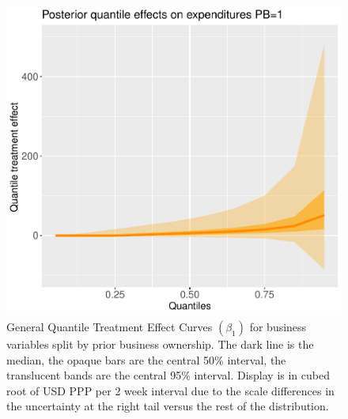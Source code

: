 \documentclass[AER]{AEA}
\begin{document}
\begin{figure}[h!]
    \includegraphics{posterior_parent_quantile_TEs_expenditures_pb_1_lognormal.pdf}
  \caption{ General Quantile Treatment Effect Curves $(\beta_1)$ for business variables split by prior business ownership. The dark line is the median, the opaque bars are the central 50\% interval, the translucent bands are the central 95\% interval. Display is in cubed root of USD PPP per 2 week interval due to the scale differences in the uncertainty at the right tail versus the rest of the distribution. }\label{posterior mean quantiles profit pb split}
\end{figure}









\clearpage \newpage
\end{document}
